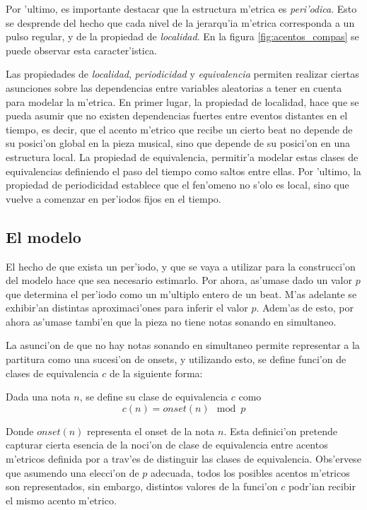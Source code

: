 Por 'ultimo, es importante destacar que la estructura m'etrica es \emph{peri'odica}. Esto se desprende del hecho que cada nivel 
de la jerarqu'ia m'etrica corresponda a un pulso regular, y de la propiedad de \emph{localidad}. En la figura 
\ref{fig:acentos_compas} se puede observar esta caracter'istica.  

Las propiedades de \emph{localidad}, \emph{periodicidad} y \emph{equivalencia} permiten realizar ciertas asunciones sobre las dependencias entre variables aleatorias 
a tener en cuenta para modelar la m'etrica. En primer lugar, la propiedad de localidad, hace que se pueda asumir que no existen dependencias fuertes 
entre eventos distantes en el tiempo, es decir, que el acento m'etrico que recibe un cierto beat no depende de su posici'on global en la pieza musical, 
sino que depende de su posici'on en una estructura local.   
La propiedad de equivalencia, permitir'a modelar estas clases de equivalencias definiendo el paso del tiempo como saltos entre ellas. 
Por 'ultimo, la propiedad de periodicidad establece que el fen'omeno no s'olo es local, 
sino que vuelve a comenzar en per'iodos fijos en el tiempo.

\subsection{El modelo}
\label{sec:rythm_model}
El hecho de que exista un per'iodo, y que se vaya a utilizar para la construcci'on del modelo hace que sea necesario estimarlo. Por ahora, as'umase dado un valor 
$p$ que determina el per'iodo como un m'ultiplo entero de un beat. M'as adelante se exhibir'an distintas aproximaci'ones para inferir el valor $p$. Adem'as
de esto, por ahora as'umase tambi'en que la pieza no tiene notas sonando en simultaneo.

La asunci'on de que no hay notas sonando en simultaneo permite representar a la partitura como una sucesi'on de onsets, y utilizando esto, se define 
funci'on de clases de equivalencia $c$ de la siguiente forma:

\begin{definition}
\label{def:traduccion_original}
Dada una nota $n$, se define su clase de equivalencia $c$ como $$c(n) = onset(n)\mod p$$
\end{definition}

Donde $onset(n)$ representa el onset de la nota $n$.  Esta definici'on pretende capturar cierta esencia de la noci'on de clase de equivalencia entre acentos m'etricos definida por \cite{Benjamin84} a 
trav'es de distinguir las clases de equivalencia. Obs'ervese que asumendo una elecci'on de $p$ adecuada, todos los posibles acentos m'etricos 
son representados, sin embargo, distintos valores de la funci'on $c$ podr'ian recibir el mismo acento m'etrico. 

